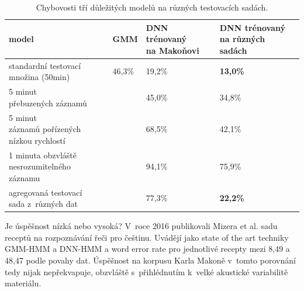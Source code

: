 \begin{table}[htpb]
\begin{center}
\begin{tabular}{|l|l|l|l|}
\hline
model & GMM & \makecell{ DNN trénovaný\\ na Makoňovi } & \makecell{ DNN trénovaný\\ na různých sadách } \\
\hline
\makecell{standardní testovací\\ množina (50min)} & 46,3\% & 19,2\% & \textbf{13,0\%} \\ \hline
\makecell{5 minut\\ přebuzených záznamů} & & 45,0\% & 34,8\% \\ \hline
\makecell{5 minut\\ záznamů pořízených\\ nízkou rychlostí } & & 68,5\% & 42,1\% \\ \hline
\makecell{1 minuta obzvláště\\ nesrozumitelného záznamu } & & 94,1\% & 75,9\% \\ \hline
\makecell{agregovaná testovací\\ sada z~různých dat} & & 77,3\% & \textbf{22,2\%} \\ \hline %
\end{tabular}
\caption{Chybovosti tří důležitých modelů na různých testovacích sadách.}\label{tab:asr-scores}
\end{center}
\end{table}

Je úspěšnost nízká nebo vysoká? V~roce 2016 publikovali Mizera et
al.\cite{mizera2016kaldi} sadu receptů na rozpoznávání řeči pro češtinu.
Uvádějí jako state of the art techniky GMM-HMM a DNN-HMM a word error rate pro
jednotlivé recepty mezi 8,49 a 48,47 podle povahy dat. Úspěšnost na korpusu
Karla Makoně v~tomto porovnání tedy nijak nepřekvapuje, obzvláště s~přihlédnutím
k~velké akustické variabilitě materiálu.

